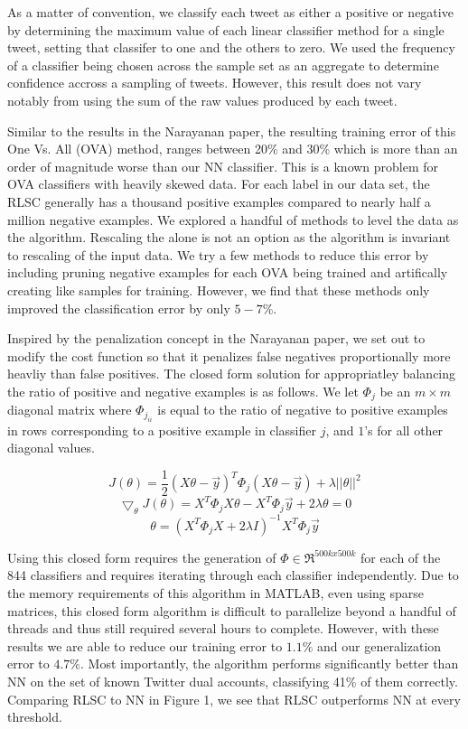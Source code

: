 \documentclass[10pt, conference, compsocconf]{IEEEtran}
\begin{document}
As a matter of convention, we classify each tweet as either a positive
or negative by determining the maximum value of each linear classifier
method for a single tweet, setting that classifer to one and the
others to zero.  We used the frequency of a classifier being chosen
across the sample set as an aggregate to determine confidence accross
a sampling of tweets.  However, this result does not vary notably from
using the sum of the raw values produced by each tweet.
  
Similar to the results in the Narayanan paper, the resulting training
error of this One Vs. All (OVA) method, ranges between 20\% and 30\%
which is more than an order of magnitude worse than our NN classifier.
This is a known problem for OVA classifiers with heavily skewed
data. For each label in our data set, the RLSC generally has a
thousand positive examples compared to nearly half a million negative
examples. We explored a handful of methods to level the data as the
algorithm.  Rescaling the alone is not an option as the algorithm is
invariant to rescaling of the input data. We try a few methods
\cite{Schapire} to reduce this error by including pruning \cite{Dekel}
negative examples for each OVA being trained and artifically creating
like samples for training.  However, we find that these methods only
improved the classification error by only $5-7\%$.

Inspired by the penalization concept in the Narayanan paper, we set
out to modify the cost function so that it penalizes false negatives
proportionally more heavliy than false positives. The closed form
solution for appropriatley balancing the ratio of positive and
negative examples is as follows. We let $\Phi_j$ be an $m \times m$
diagonal matrix where $\Phi_{j_{ii}}$ is equal to the ratio of
negative to positive examples in rows corresponding to a positive
example in classifier $j$, and $1$'s for all other diagonal values.

$$J(\theta) = \frac{1}{2} (X\theta - \vec{y})^T \Phi_j (X\theta-\vec{y}) + \lambda ||\theta||^2 $$
$$ \bigtriangledown_\theta J(\theta) = X^T \Phi_j X \theta -X^T \Phi_j \vec{y} +2 \lambda \theta = 0$$
$$ \theta= (X^T\Phi_j X+2 \lambda I)^{-1} X^T \Phi_j \vec{y}$$

Using this closed form requires the generation of $\Phi \in \Re^{500k
  x 500k}$ for each of the 844 classifiers and requires iterating
through each classifier independently.  Due to the memory requirements
of this algorithm in MATLAB, even using sparse matrices, this closed
form algorithm is difficult to parallelize beyond a handful of threads
and thus still required several hours to complete.  However, with
these results we are able to reduce our training error to $1.1\%$ and
our generalization error to $4.7\%$. Most importantly, the algorithm
performs significantly better than NN on the set of known Twitter dual
accounts, classifying 41\% of them correctly. Comparing RLSC to NN in
Figure 1, we see that RLSC outperforms NN at every threshold.
\end{document}
